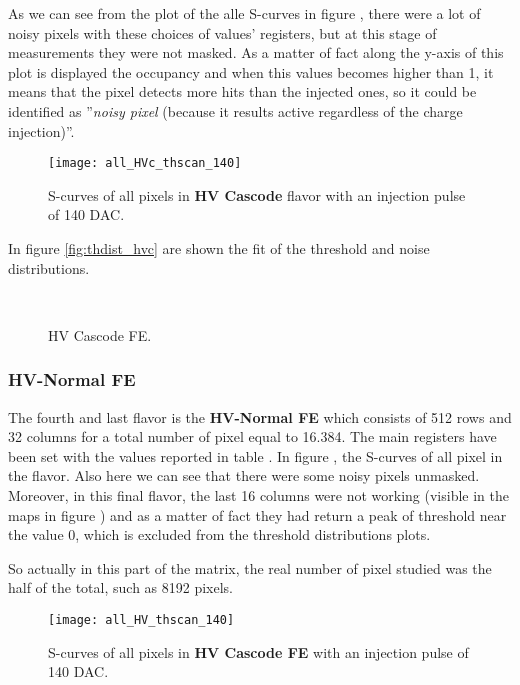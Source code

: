 As we can see from the plot of the alle S-curves in figure , there were a lot of noisy pixels with these choices of values' registers, but at this stage of measurements they were not masked.
As a matter of fact along the y-axis of this plot is displayed the occupancy and when this values becomes higher than 1, it means that the pixel detects more hits than the injected ones, so it could be identified as ''\textit{noisy pixel} (because it results active regardless of the charge injection)''.


\begin{figure}[h!]
\centering
\texttt{[image: all\_HVc\_thscan\_140]}
\caption{S-curves of all pixels in \textbf{HV Cascode} flavor with an injection pulse of 140 DAC.}
\label{fig:hvc_scurve_140}
\end{figure}

In figure \vref{fig:thdist_hvc} are shown the fit of the threshold and noise distributions.

\begin{figure}[h!]
\centering
{}\quad
{}\\
\caption{HV Cascode FE.}
\label{fig:thdist_hvc}
\end{figure}


\subsubsection{HV-Normal FE}

The fourth and last flavor is the \textbf{HV-Normal FE} which consists of 512 rows and 32 columns for a total number of pixel equal to 16.384. The main registers have been set with the values reported in table .
In figure , the S-curves of all pixel in the flavor. Also here we can see that there were some noisy pixels unmasked.
Moreover, in this final flavor, the last 16 columns were not working (visible in the maps in figure ) and as a matter of fact they had return a peak of threshold near the value 0, which is excluded from the threshold distributions plots.

So actually in this part of the matrix, the real number of pixel studied was the half of the total, such as 8192 pixels.


\begin{figure}[h!]
\centering
\texttt{[image: all\_HV\_thscan\_140]}
\caption{S-curves of all pixels in \textbf{HV Cascode FE} with an injection pulse of 140 DAC.}
\label{fig:hv_scurve_140}
\end{figure}

